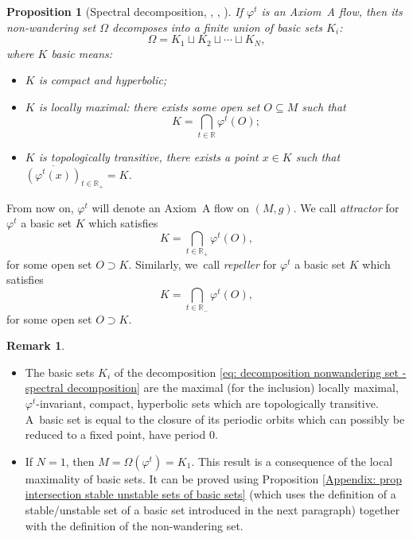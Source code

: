 \documentclass[JEP,XML,SOM,Unicode,NoEqCountersInSection,NoFloatCountersInSection,published]{cedram}
\theoremstyle{definition}
\newtheorem{remark}[definition]{Remark}
\theoremstyle{plain}
\newtheorem{prop}[definition]{Proposition}
\newcommand{\R}{\mathbb{R}}
\begin{document}
\begin{prop}[{Spectral decomposition, \cite[\S II.5]{smale}, \cite{bowen2}, \cite[Th.\,5.3.37]{FH}}]
If $\varphi^t$ is an Axiom~A flow, then its non-wandering set $\Omega$ decomposes into a finite union of \emph{basic} sets $K_i$:\vspace*{-3pt}
\begin{equation}\label{eq: decomposition nonwandering set - spectral decomposition}
\Omega = K_1 \sqcup K_2 \sqcup \cdots \sqcup K_N,
\end{equation}
where $K$ basic means:
\begin{itemize}
\item $K$ is compact and hyperbolic;
\item $K$ is locally maximal: there exists some open set $O\subseteq M$ such that\vspace*{-3pt}
\[
K = \bigcap_{t \in \R} \varphi^t (O);
\]
\item $K$ is topologically transitive, \ie there exists a point $x \in K$ such that \\$\overline{(\varphi^t(x))}_{t \in \R_+} = K$.
\end{itemize}
\end{prop}

From now on, $\varphi^t$ will denote an Axiom~A flow on $(M,g)$. We call \textit{attractor} for $\varphi^t$ a basic set $K$ which satisfies\vspace*{-3pt}
\[
K = \bigcap_{t \in \R_+} \varphi^t (O),
\]
for some open set $O \supset K$. Similarly, we~call \textit{repeller} for $\varphi^t$ a basic set $K$ which satisfies\vspace*{-3pt}
\[
K = \bigcap_{t \in \R_-} \varphi^t (O),
\]
for some open set $O \supset K$.

\skpt
\begin{remark}\label{rk: fixed point isolated}
\begin{itemize}
\item The basic sets $K_i$ of the decomposition \eqref{eq: decomposition nonwandering set - spectral decomposition} are the maximal (for the inclusion) locally maximal, $\varphi^t$-invariant, compact, hyperbolic sets which are topologically transitive. A~basic set is equal to the closure of its periodic orbits which can possibly be reduced to a fixed point, \ie have period $0$.
\item If $N = 1$, then $M = \Omega (\varphi^t) = K_1$. This result is a consequence of the local maximality of basic sets. It can be proved using Proposition \ref{Appendix: prop intersection stable unstable sets of basic sets} (which uses the definition of a stable/unstable set of a basic set introduced in the next paragraph) together with the definition of the non-wandering set.
\end{itemize}
\end{remark}
\end{document}
